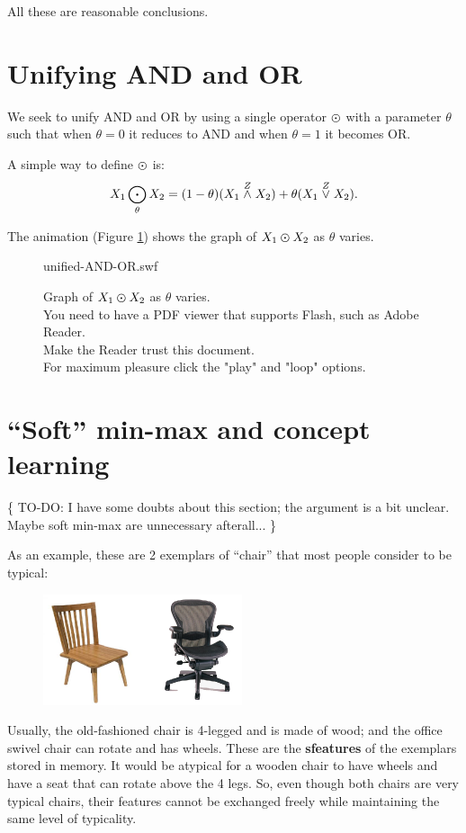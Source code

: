 All these are reasonable conclusions.

\section{Unifying AND and OR}
\label{sec:unifying-AND-and-OR}

We seek to unify AND and OR by using a single operator $\varodot$ with a parameter $\theta$ such that when $\theta = 0$ it reduces to AND and when $\theta = 1$ it becomes OR.

A simple way to define $\varodot$ is:
\begin{equation}
X_1 \bigodot_\theta X_2 = (1-\theta) (X_1 \stackrel{Z}{\wedge} X_2) + \theta (X_1 \stackrel{Z}{\vee} X_2).
\end{equation}

The animation (Figure \ref{movie:unified-AND-OR}) shows the graph of $X_1 \varodot X_2$ as $\theta$ varies.

\begin{figure}[H]
\centering
{}
{unified-AND-OR.swf}
\caption{Graph of $X_1 \varodot X_2$ as $\theta$ varies.\\
\scriptsize{You need to have a PDF viewer that supports Flash, such as Adobe Reader.\\
Make the Reader trust this document.\\
For maximum pleasure click the "play" and "loop" options.}}
\label{movie:unified-AND-OR}
\end{figure}

\section{``Soft'' min-max and concept learning}

\{ TO-DO:  I have some doubts about this section; the argument is a bit unclear.  Maybe soft min-max are unnecessary afterall... \}

As an example, these are 2 exemplars of ``chair'' that most people consider to be typical:
\begin{figure}[H]
\centering
\includegraphics{2-chairs.png}
\end{figure}
Usually, the old-fashioned chair is 4-legged and is made of wood; and the office swivel chair can rotate and has wheels.  These are the \textbf{sfeatures} of the exemplars stored in memory.  It would be atypical for a wooden chair to have wheels and have a seat that can rotate above the 4 legs.  So, even though both chairs are very typical chairs, their features cannot be exchanged freely while maintaining the same level of typicality.

